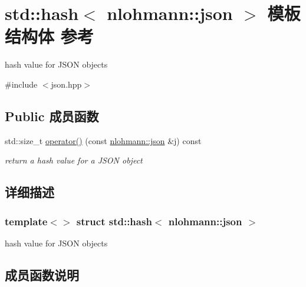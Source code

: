 \hypertarget{structstd_1_1hash_3_01nlohmann_1_1json_01_4}{}\section{std\+::hash$<$ nlohmann\+::json $>$ 模板结构体 参考}
\label{structstd_1_1hash_3_01nlohmann_1_1json_01_4}


hash value for J\+S\+ON objects  




{\ttfamily \#include $<$json.\+hpp$>$}

\subsection*{Public 成员函数}
\begin{DoxyCompactItemize}
\item 
std\+::size\+\_\+t \mbox{\hyperlink{structstd_1_1hash_3_01nlohmann_1_1json_01_4_aec1567d1fa47dbe5b77954dce3a55b64}{operator()}} (const \mbox{\hyperlink{namespacenlohmann_a2bfd99e845a2e5cd90aeaf1b1431f474}{nlohmann\+::json}} \&j) const
\begin{DoxyCompactList}\small\item\em return a hash value for a J\+S\+ON object \end{DoxyCompactList}\end{DoxyCompactItemize}


\subsection{详细描述}
\subsubsection*{template$<$$>$\newline
struct std\+::hash$<$ nlohmann\+::json $>$}

hash value for J\+S\+ON objects 

\subsection{成员函数说明}
\mbox{\label{structstd_1_1hash_3_01nlohmann_1_1json_01_4_aec1567d1fa47dbe5b77954dce3a55b64}} 

